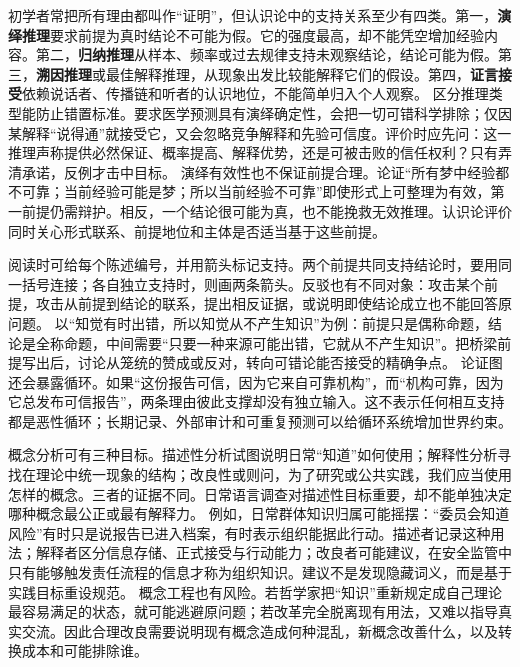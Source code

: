 初学者常把所有理由都叫作“证明”，但认识论中的支持关系至少有四类。第一，\textbf{演绎推理}要求前提为真时结论不可能为假。它的强度最高，却不能凭空增加经验内容。第二，\textbf{归纳推理}从样本、频率或过去规律支持未观察结论，结论可能为假。第三，\textbf{溯因推理}或最佳解释推理，从现象出发比较能解释它们的假设。第四，\textbf{证言接受}依赖说话者、传播链和听者的认识地位，不能简单归入个人观察。 区分推理类型能防止错置标准。要求医学预测具有演绎确定性，会把一切可错科学排除；仅因某解释“说得通”就接受它，又会忽略竞争解释和先验可信度。评价时应先问：这一推理声称提供必然保证、概率提高、解释优势，还是可被击败的信任权利？只有弄清承诺，反例才击中目标。 演绎有效性也不保证前提合理。论证“所有梦中经验都不可靠；当前经验可能是梦；所以当前经验不可靠”即使形式上可整理为有效，第一前提仍需辩护。相反，一个结论很可能为真，也不能挽救无效推理。认识论评价同时关心形式联系、前提地位和主体是否适当基于这些前提。

阅读时可给每个陈述编号，并用箭头标记支持。两个前提共同支持结论时，要用同一括号连接；各自独立支持时，则画两条箭头。反驳也有不同对象：攻击某个前提，攻击从前提到结论的联系，提出相反证据，或说明即使结论成立也不能回答原问题。 以“知觉有时出错，所以知觉从不产生知识”为例：前提只是偶称命题，结论是全称命题，中间需要“只要一种来源可能出错，它就从不产生知识”。把桥梁前提写出后，讨论从笼统的赞成或反对，转向可错论能否接受的精确争点。 论证图还会暴露循环。如果“这份报告可信，因为它来自可靠机构”，而“机构可靠，因为它总发布可信报告”，两条理由彼此支撑却没有独立输入。这不表示任何相互支持都是恶性循环；长期记录、外部审计和可重复预测可以给循环系统增加世界约束。

概念分析可有三种目标。描述性分析试图说明日常“知道”如何使用；解释性分析寻找在理论中统一现象的结构；改良性或则问，为了研究或公共实践，我们应当使用怎样的概念。三者的证据不同。日常语言调查对描述性目标重要，却不能单独决定哪种概念最公正或最有解释力。 例如，日常群体知识归属可能摇摆：“委员会知道风险”有时只是说报告已进入档案，有时表示组织能据此行动。描述者记录这种用法；解释者区分信息存储、正式接受与行动能力；改良者可能建议，在安全监管中只有能够触发责任流程的信息才称为组织知识。建议不是发现隐藏词义，而是基于实践目标重设规范。 概念工程也有风险。若哲学家把“知识”重新规定成自己理论最容易满足的状态，就可能逃避原问题；若改革完全脱离现有用法，又难以指导真实交流。因此合理改良需要说明现有概念造成何种混乱，新概念改善什么，以及转换成本和可能排除谁。

